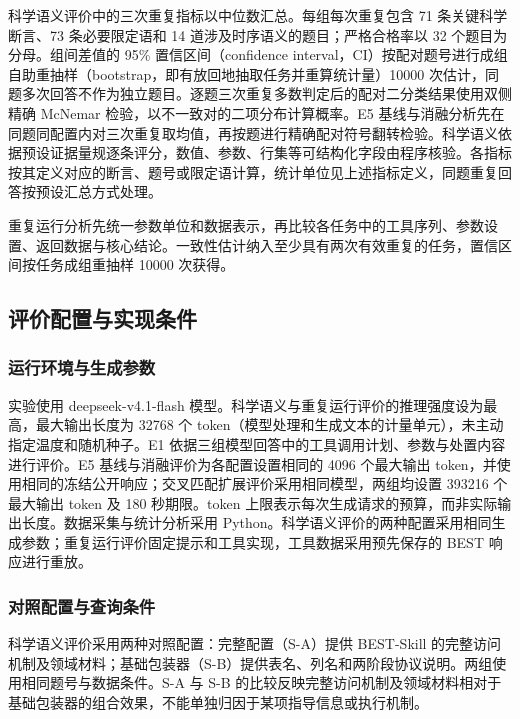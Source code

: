 \documentclass{dcfp}
\begin{document}
\begin{PaperBody}
科学语义评价中的三次重复指标以中位数汇总。每组每次重复包含 71 条关键科学断言、73 条必要限定语和 14 道涉及时序语义的题目；严格合格率以 32 个题目为分母。组间差值的 95\% 置信区间（confidence interval，CI）按配对题号进行成组自助重抽样（bootstrap，即有放回地抽取任务并重算统计量）10000 次估计，同题多次回答不作为独立题目。逐题三次重复多数判定后的配对二分类结果使用双侧精确 McNemar 检验，以不一致对的二项分布计算概率\citep{ref14,ref15}。E5 基线与消融分析先在同题同配置内对三次重复取均值，再按题进行精确配对符号翻转检验。科学语义依据预设证据量规逐条评分，数值、参数、行集等可结构化字段由程序核验。各指标按其定义对应的断言、题号或限定语计算，统计单位见上述指标定义，同题重复回答按预设汇总方式处理。

重复运行分析先统一参数单位和数据表示，再比较各任务中的工具序列、参数设置、返回数据与核心结论。一致性估计纳入至少具有两次有效重复的任务，置信区间按任务成组重抽样 10000 次获得。

\subsection{评价配置与实现条件}

\subsubsection{运行环境与生成参数}

实验使用 deepseek-v4.1-flash 模型。科学语义与重复运行评价的推理强度设为最高，最大输出长度为 32768 个 token（模型处理和生成文本的计量单元），未主动指定温度和随机种子。E1 依据三组模型回答中的工具调用计划、参数与处置内容进行评价。E5 基线与消融评价为各配置设置相同的 4096 个最大输出 token，并使用相同的冻结公开响应；交叉匹配扩展评价采用相同模型，两组均设置 393216 个最大输出 token 及 180 秒期限。token 上限表示每次生成请求的预算，而非实际输出长度。数据采集与统计分析采用 Python。科学语义评价的两种配置采用相同生成参数；重复运行评价固定提示和工具实现，工具数据采用预先保存的 BEST 响应进行重放。

\subsubsection{对照配置与查询条件}

科学语义评价采用两种对照配置：完整配置（S-A）提供 BEST-Skill 的完整访问机制及领域材料；基础包装器（S-B）提供表名、列名和两阶段协议说明。两组使用相同题号与数据条件。S-A 与 S-B 的比较反映完整访问机制及领域材料相对于基础包装器的组合效果，不能单独归因于某项指导信息或执行机制。


\end{PaperBody}
\end{document}
